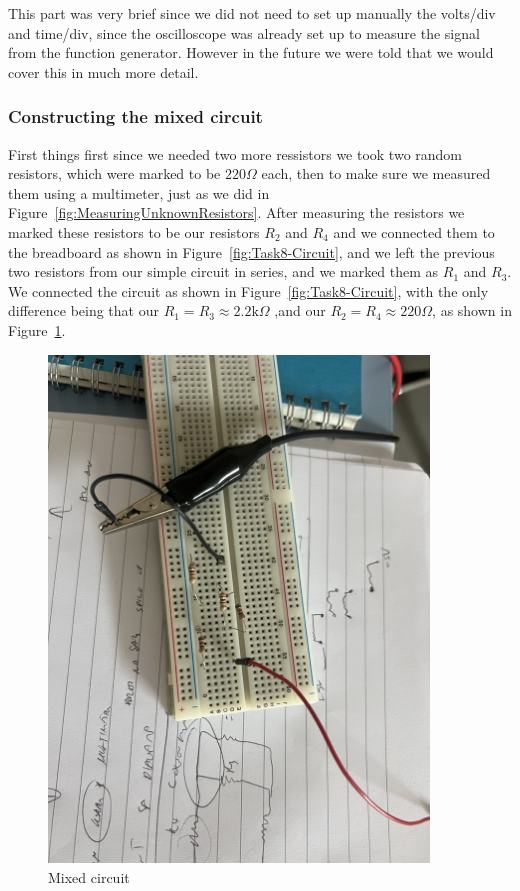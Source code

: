 \documentclass[a4paper, 10pt]{article}
\newcommand{\figref}[1]{Figure~\ref{#1}}
\begin{document}
					This part was very brief since we did not need to set up manually the volts/div and time/div, since the oscilloscope was already set up to measure the
					signal from the function generator. However in the future we were told that we would cover this in much more detail.

				\subsubsection{Constructing the mixed circuit}
					First things first since we needed two more ressistors we took two random resistors, which were marked to be $220\Omega$ each, then to make sure we
					measured them using a multimeter, just as we did in \figref{fig:MeasuringUnknownResistors}. After measuring the resistors we marked these resistors to
					be our resistors $R_2$ and $R_4$ and we connected them to the breadboard as shown in \figref{fig:Task8-Circuit}, and we left the previous two resistors
					from our simple circuit in series, and we marked them as $R_1$ and $R_3$. We connected the circuit as shown in \figref{fig:Task8-Circuit}, with the only
					difference being that our $R_1 = R_3 \approx 2.2 \text{k}\Omega$ ,and our $R_2 = R_4 \approx 220\Omega$, as shown in \figref{fig:MixedCircuit}.
					\begin{figure}[h!]
						\centering
						\includegraphics[angle = 90,width=0.9\textwidth]{./images/MixedCircuit.jpeg}
						\caption{Mixed circuit}
						\label{fig:MixedCircuit}
					\end{figure}
\end{document}
